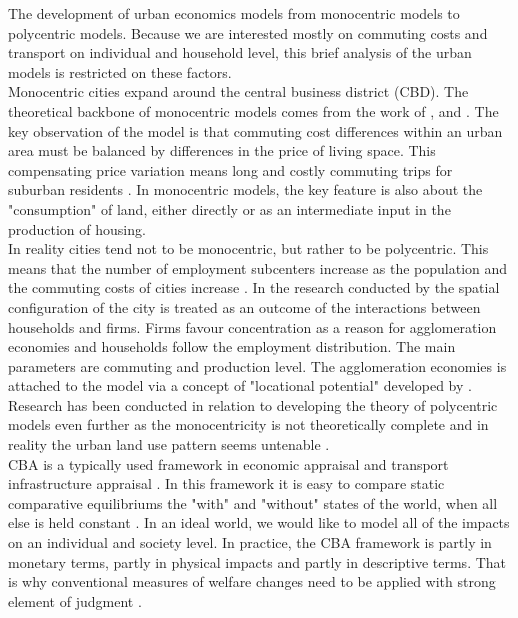 \documentclass[a4paper, 12 pt]{article}   	%
\begin{document}
The development of urban economics models from monocentric models to polycentric models. Because we are interested mostly on commuting costs and transport on individual and household level, this brief analysis of the urban models is restricted on these factors. \\

Monocentric cities expand around the central business district (CBD). The theoretical backbone of monocentric models comes from the work of \cite{alonso}, \cite{mills} and \cite{muth}. The key observation of the model is that commuting cost differences within an urban area must be balanced by differences in the price of living space. This compensating price variation means long and costly commuting trips for suburban residents \citep{brueckner}. In monocentric models, the key feature is also about the "consumption" of land, either directly or as an intermediate input in the production of housing. \\

In reality cities tend not to be monocentric, but rather to be polycentric. This means that the number of employment subcenters increase as the population and the commuting costs of cities increase \citep{mcmillen}. In the research conducted by \cite{fujita} the spatial configuration of the city is treated as an outcome of the interactions between households and firms. Firms favour concentration as a reason for agglomeration economies and households follow the employment distribution. The main parameters are commuting and production level. The agglomeration economies is attached to the model via a concept of "locational potential" developed by \cite{fujita}. Research has been conducted in relation to developing the theory of polycentric models even further as the monocentricity is not theoretically complete and in reality the urban land use pattern seems untenable \citep{fujita}. \\

CBA is a typically used framework in economic appraisal and transport infrastructure appraisal \citep{venables2007}. In this framework it is easy to compare static comparative equilibriums the "with" and "without" states of the world, when all else is held constant \citep{mackie}. In an ideal world, we would like to model all of the impacts on an individual and society level. In practice, the CBA framework is partly in monetary terms, partly in physical impacts and partly in descriptive terms. That is why conventional measures of welfare changes need to be applied with strong element of judgment \citep{mackie}. \\
\end{document}
